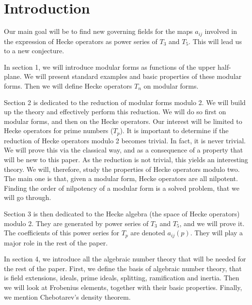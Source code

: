 \setcounter{section}{-1}
\section{Introduction}

Our main goal will be to find new governing fields for the maps $a_{ij}$ involved in the expression of Hecke operators as power series of $T_3$ and $T_5$.
This will lead us to a new conjecture.



In section 1, we will introduce modular forms as functions of the upper half-plane.
We will present standard examples and basic properties of these modular forms.
Then we will define Hecke operators $T_n$ on modular forms.

Section 2 is dedicated to the reduction of modular forms modulo 2.
We will build up the theory and effectively perform this reduction.
We will do so first on modular forms, and then on the Hecke operators.
Our interest will be limited to Hecke operators for prime numbers ($T_p$).
It is important to determine if the reduction of Hecke operators modulo 2 becomes trivial.
In fact, it is never trivial.
We will prove this via the classical way, and as a consequence of a property that will be new to this paper.
As the reduction is not trivial, this yields an interesting theory.
We will, therefore, study the properties of Hecke operators modulo two.
The main one is that, given a modular form, Hecke operators are all nilpotent.
Finding the order of nilpotency of a modular form is a solved problem, that we will go through.

Section 3 is then dedicated to the Hecke algebra (the space of Hecke operators) modulo 2.
They are generated by power series of $T_3$ and $T_5$, and we will prove it.
The coefficients of this power series for $T_p$ are denoted $a_{ij}(p)$.
They will play a major role in the rest of the paper.

In section 4, we introduce all the algebraic number theory that will be needed for the rest of the paper.
First, we define the basis of algebraic number theory, that is field extensions, ideals, prime ideals, splitting, ramification and inertia.
Then we will look at Frobenius elements, together with their basic properties.
Finally, we mention Chebotarev's density theorem.

